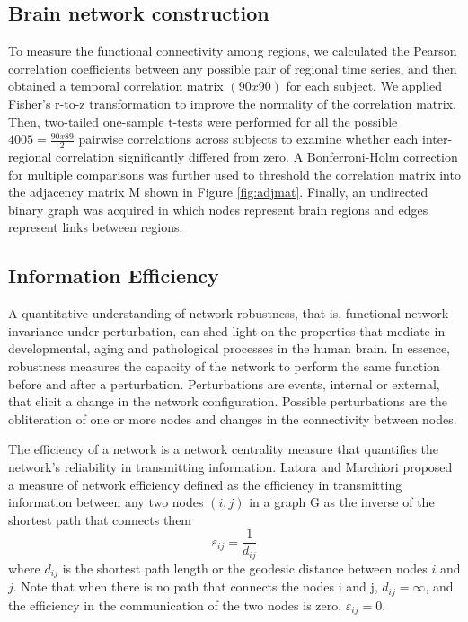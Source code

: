 \documentclass[12pt,a4paper]{article}
\begin{document}
\subsection{Brain network construction} 
To measure the functional connectivity among regions, we calculated the Pearson
correlation coefficients between any possible pair of regional time series, and
then obtained a temporal correlation matrix $(90x90)$ for each subject. We
applied Fisher's r-to-z transformation to improve the normality of the
correlation matrix. Then, two-tailed one-sample t-tests were performed for all
the possible $4005=\frac{90x89}{2}$ pairwise correlations across subjects
to examine whether each inter-regional correlation significantly differed from
zero. 
A Bonferroni-Holm correction for multiple comparisons was
further used to threshold the correlation matrix into the adjacency matrix M shown in Figure \ref{fig:adjmat}. Finally, an undirected binary graph was acquired in which nodes represent brain regions and edges represent links between regions.

\subsection{Information Efficiency}
\label{ss:nrobeffvul}
A quantitative understanding of network robustness, that is, functional
network invariance under perturbation, can shed light on 
the properties that mediate in developmental, aging and pathological processes
in the human brain. In essence, robustness measures the capacity of the network to
perform the same function before and after a perturbation. Perturbations are
events, internal or external, that elicit a change in the network
configuration. Possible perturbations are the obliteration of one or more nodes and changes in the
connectivity between nodes. 

The efficiency of a network is a network centrality
measure that quantifies the network's reliability in transmitting information. 
Latora and Marchiori \cite{latora_efficient_2001} proposed a measure of network
efficiency defined as the efficiency in transmitting information 
between any two nodes $(i,j)$ in a graph G as the inverse of the shortest path that
connects them
\begin{equation}
\varepsilon_{ij}= \frac{1} {d_{ij}}
\label{eq:geod}
\end{equation}
where $d_{ij}$ is the
shortest path length or the geodesic distance between nodes $i$ and $j$. 
Note that when there is no path that connects the nodes i and j, $d_{ij}=
\infty$, and the efficiency in the communication of the two nodes is zero,
$\varepsilon_{ij}=0$.
\end{document}

